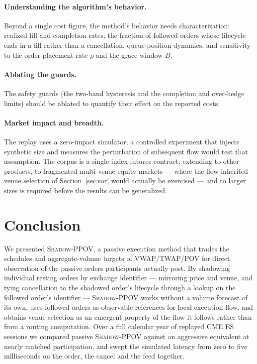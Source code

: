 \documentclass[11pt]{article}
\newcommand{\pov}{\textsc{Shadow-PPOV}}
\begin{document}
\paragraph{Understanding the algorithm's behavior.} Beyond a single cost figure,
the method's behavior needs characterization: realized fill and completion
rates, the fraction of followed orders whose lifecycle ends in a fill rather than
a cancellation, queue-position dynamics, and sensitivity to the order-placement
rate $\rho$ and the grace window $B$.

\paragraph{Ablating the guards.} The safety guards (the two-band hysteresis and the completion and over-hedge
limits) should be ablated to quantify their effect on the reported costs.

\paragraph{Market impact and breadth.} The replay uses a zero-impact simulator;
a controlled experiment that injects synthetic size and measures the perturbation
of subsequent flow would test that assumption. The corpus is a single
index-futures contract; extending to other products, to fragmented multi-venue
equity markets --- where the flow-inherited venue selection of
Section~\ref{sec:sor} would actually be exercised --- and to larger sizes is
required before the results can be generalized.

\section{Conclusion}

We presented \pov{}, a passive execution method that trades the schedules and
aggregate-volume targets of VWAP/TWAP/POV for direct observation of the passive
orders participants actually post. By shadowing individual resting orders by
exchange identifier --- mirroring price and venue, and tying cancellation to
the shadowed order's lifecycle through a lookup on the followed order's identifier 
--- \pov{} works without a volume forecast of its own, uses followed orders as
observable references for local execution flow, and obtains venue selection as
an emergent property of the flow it follows rather than from a routing
computation. Over a full
calendar year of replayed CME ES sessions we compared passive \pov{} against an
aggressive equivalent at nearly matched participation, and swept the simulated latency
from zero to five milliseconds on the order, the cancel and the feed together.
\end{document}
